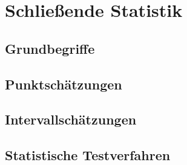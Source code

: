 \section{Schließende Statistik}

\subsection{Grundbegriffe}

\subsection{Punktschätzungen}

\subsection{Intervallschätzungen}

\subsection{Statistische Testverfahren
}
